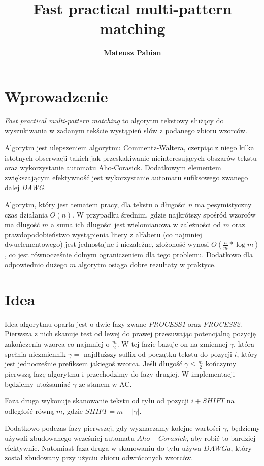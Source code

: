 \documentclass[a4paper,11pt]{article}
\title{\textbf{Fast practical multi-pattern matching}}
\author{\textbf{Mateusz Pabian}}
\date{}
\begin{document}
\maketitle

\section{Wprowadzenie}
\textit{Fast practical multi-pattern matching} to algorytm tekstowy służący do wyszukiwania w zadanym tekście wystąpień słów z podanego zbioru wzorców.

Algorytm jest ulepszeniem algorytmu Commentz-Waltera, czerpiąc z niego kilka istotnych obserwacji takich jak przeskakiwanie nieinteresujących obszarów tekstu oraz wykorzystanie automatu Aho-Corasick. Dodatkowym elementem zwiększającym efektywność jest wykorzystanie automatu sufiksowego zwanego dalej \textit{DAWG}.   

Algorytm, który jest tematem pracy, dla tekstu o długości $n$ ma pesymistyczny czas działania $O(n)$.
W przypadku średnim, gdzie najkrótszy spośród wzorców ma długość $m$ a suma ich długości jest wielomianowa w zależności od $m$ oraz prawdopodobieństwo wystąpienia litery z alfabetu (co najmniej dwuelementowego) jest jednostajne i niezależne, złożoność wynosi $O(\frac{n}{m}* \log{m})$, co jest równocześnie dolnym ograniczeniem dla tego problemu.
Dodatkowo dla odpowiednio dużego $m$ algorytm osiąga dobre rezultaty w praktyce.

\section{Idea}

Idea algorytmu oparta jest o dwie fazy zwane \textit{PROCESS1} oraz \textit{PROCESS2}. Pierwsza z nich skanuje test od lewej do prawej przesuwając potencjalną pozycję zakończenia wzorca co najmniej o $\frac{m}{2}$. W tej fazie bazuje on na zmiennej $\gamma$, która spełnia niezmiennik $\gamma = $ najdłuższy suffix od początku tekstu do pozycji $i$, który jest jednocześnie prefiksem jakiegoś wzorca. Jeśli długość $\gamma \leq \frac{m}{2}$ kończymy pierwszą fazę algorytmu i przechodzimy do fazy drugiej. W implementacji będziemy utożsamiać $\gamma$ ze stanem w AC.

Faza druga wykonuje skanowanie tekstu od tyłu od pozycji $i + SHIFT$ na odległość równą $m$, gdzie $SHIFT = m - |\gamma|$.

Dodatkowo podczas fazy pierwszej, gdy wyznaczamy kolejne wartości $\gamma$, będziemy używali zbudowanego wcześniej automatu $Aho-Corasick$, aby robić to bardziej efektywnie. Natomiast faza druga w skanowaniu do tyłu używa $DAWGa$, który został zbudowany przy użyciu zbioru odwróconych wzorców.  
\end{document}
